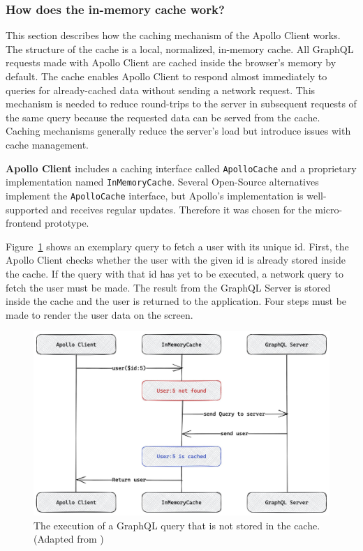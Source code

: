 \subsubsection{How does the in-memory cache work?}\label{subsubsection:background:graphql:apollo-server-client:in-memory-cache-working}

This section describes how the caching mechanism of the Apollo Client works. The structure of the cache is a local, normalized, in-memory cache. All GraphQL requests made with Apollo Client are cached inside the browser's memory by default. The cache enables Apollo Client to respond almost immediately to queries for already-cached data without sending a network request. This mechanism is needed to reduce round-trips to the server in subsequent requests of the same query because the requested data can be served from the cache. \cite{misc:-:background:graphql:apollo-client-cache-overview} Caching mechanisms generally reduce the server's load but introduce issues with cache management.

\bigskip

\noindent \textbf{Apollo Client} includes a caching interface called \texttt{ApolloCache} and a proprietary implementation named \texttt{InMemoryCache}. Several Open-Source alternatives implement the \texttt{ApolloCache} interface, but Apollo's implementation is well-supported and receives regular updates. Therefore it was chosen for the micro-frontend prototype.

\bigskip

\noindent Figure~\ref{fig:background:graphql:user-query-first-time} shows an exemplary query to fetch a user with its unique id. First, the Apollo Client checks whether the user with the given id is already stored inside the cache. If the query with that id has yet to be executed, a network query to fetch the user must be made. The result from the GraphQL Server is stored inside the cache and the user is returned to the application. Four steps must be made to render the user data on the screen. \cite{misc:-:background:graphql:apollo-client-cache-overview}

\ifshowImages
\begin{figure}[H]
  \centering
  \includegraphics[width=0.6\linewidth]{images/background/graphql/apollo/apollo-client-basic-cache.jpg}
  \caption{The execution of a GraphQL query that is not stored in the cache. (Adapted from \cite{misc:-:background:graphql:apollo-client-cache-overview})}\label{fig:background:graphql:user-query-first-time}
\end{figure}
\fi

